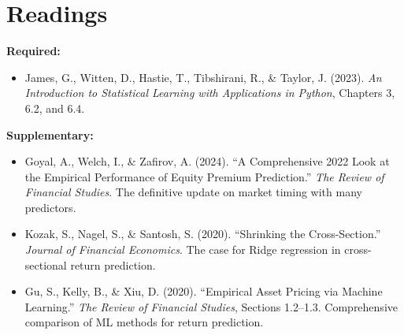 \documentclass[11pt,a4paper]{article}
\begin{document}
\section*{Readings}

\textbf{Required:}
\begin{itemize}
    \item James, G., Witten, D., Hastie, T., Tibshirani, R., \& Taylor, J. (2023). \textit{An Introduction to Statistical Learning with Applications in Python}, Chapters 3, 6.2, and 6.4.
\end{itemize}

\textbf{Supplementary:}
\begin{itemize}
    \item Goyal, A., Welch, I., \& Zafirov, A. (2024). ``A Comprehensive 2022 Look at the Empirical Performance of Equity Premium Prediction.'' \textit{The Review of Financial Studies}. The definitive update on market timing with many predictors.
    \item Kozak, S., Nagel, S., \& Santosh, S. (2020). ``Shrinking the Cross-Section.'' \textit{Journal of Financial Economics}. The case for Ridge regression in cross-sectional return prediction.
    \item Gu, S., Kelly, B., \& Xiu, D. (2020). ``Empirical Asset Pricing via Machine Learning.'' \textit{The Review of Financial Studies}, Sections 1.2--1.3. Comprehensive comparison of ML methods for return prediction.
\end{itemize}

\end{document}
